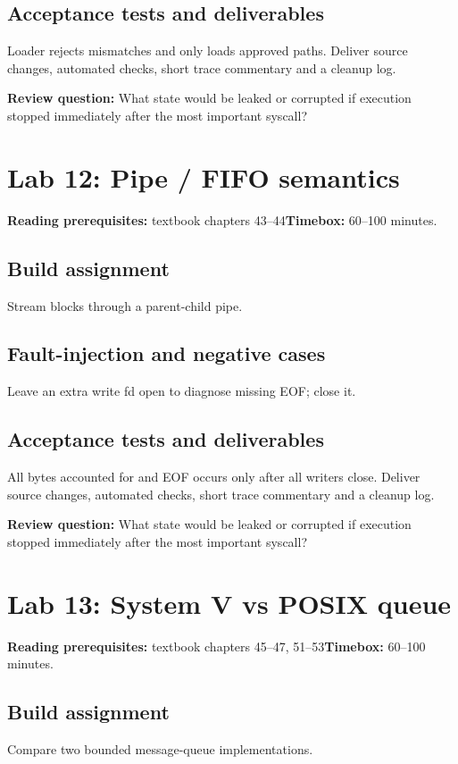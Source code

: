\documentclass[11pt,letterpaper,oneside]{report}
\begin{document}
\subsection{Acceptance tests and deliverables}
Loader rejects mismatches and only loads approved paths. Deliver source changes, automated checks, short trace commentary and a cleanup log.

\textbf{Review question:} What state would be leaked or corrupted if execution stopped immediately after the most important syscall?

\section{Lab 12: Pipe / FIFO semantics}
\textbf{Reading prerequisites:} textbook chapters 43--44\quad \textbf{Timebox:} 60--100 minutes.

\subsection{Build assignment}
Stream blocks through a parent-child pipe.

\subsection{Fault-injection and negative cases}
Leave an extra write fd open to diagnose missing EOF; close it.

\subsection{Acceptance tests and deliverables}
All bytes accounted for and EOF occurs only after all writers close. Deliver source changes, automated checks, short trace commentary and a cleanup log.

\textbf{Review question:} What state would be leaked or corrupted if execution stopped immediately after the most important syscall?

\section{Lab 13: System V vs POSIX queue}
\textbf{Reading prerequisites:} textbook chapters 45--47, 51--53\quad \textbf{Timebox:} 60--100 minutes.

\subsection{Build assignment}
Compare two bounded message-queue implementations.
\end{document}
